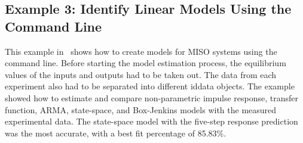\documentclass[letterpaper,12pt]{article}   %
\begin{document}
\subsection{Example 3: Identify Linear Models Using the Command Line}
\label{sec:sysID-Example3}
This example in~\cite{example3} shows how to create models for MISO systems
using the command line. Before starting the model estimation process, the
equilibrium values of the inputs and outputs had to be taken out. The data from
each experiment also had to be separated into different iddata objects. The
example showed how to estimate and compare non-parametric impulse response,
transfer function, ARMA, state-space, and Box-Jenkins models with the measured
experimental data. The state-space model with the five-step response prediction
was the most accurate, with a best fit percentage of 85.83\%.

\end{document}
